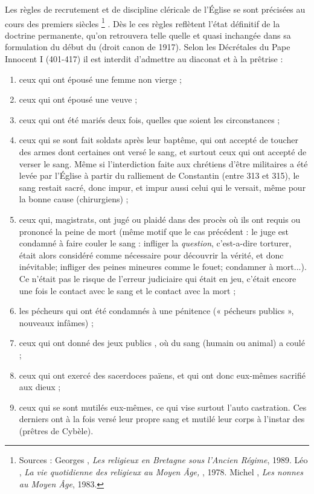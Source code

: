  Les règles de recrutement et de discipline cléricale de l'Église se sont précisées au cours des premiers siècles%
\footnote{Sources : Georges , \emph{Les religieux en Bretagne sous l'Ancien Régime}, 1989. Léo , \emph{La vie quotidienne des religieux au Moyen Âge, }, 1978. Michel , \emph{Les nonnes au Moyen Âge}, 1983.}%
. Dès le  ces règles reflètent l'état définitif de la doctrine permanente, qu'on retrouvera telle quelle et quasi inchangée dans sa formulation du début du  (droit canon de 1917). Selon les Décrétales du Pape Innocent I (401-417) il est interdit d'admettre au diaconat et à la prêtrise :
\begin{enumerate}
\item ceux qui ont épousé une femme non vierge ;
\item ceux qui ont épousé une veuve ;
\item ceux qui ont été mariés deux fois, quelles que soient les circonstances ;
\item ceux qui se sont fait soldats après leur baptême, qui ont accepté de toucher des armes dont certaines ont versé le sang, et surtout ceux qui ont accepté de verser le sang. Même si l'interdiction faite aux chrétiens d'être militaires a été levée par l'Église à partir du ralliement de Constantin (entre 313 et 315), le sang restait sacré, donc impur, et impur aussi celui qui le versait, même pour la bonne cause (chirurgiens) ;
\item ceux qui, magistrats, ont jugé ou plaidé dans des procès où ils ont requis ou prononcé la peine de mort (même motif que le cas précédent : le juge est condamné à faire couler le sang : infliger la \emph{question}, c'est-a-dire torturer, était alors considéré comme nécessaire pour découvrir la vérité, et donc inévitable; infliger des peines mineures comme le fouet; condamner à mort...). Ce n'était pas le risque de l'erreur judiciaire qui était en jeu, c'était encore une fois le contact avec le sang et le contact avec la mort ;
\item les pécheurs qui ont été condamnés à une pénitence (« pécheurs publics », nouveaux infâmes) ;
\item ceux qui ont donné des jeux publics , où du sang (humain ou animal) a coulé ;
\item ceux qui ont exercé des sacerdoces païens, et qui ont donc eux-mêmes sacrifié aux dieux ;
\item ceux qui se sont mutilés eux-mêmes, ce qui vise surtout l'auto castration. Ces derniers ont à la fois versé leur propre sang et mutilé leur corps à l'instar des  (prêtres de Cybèle).
\end{enumerate}

